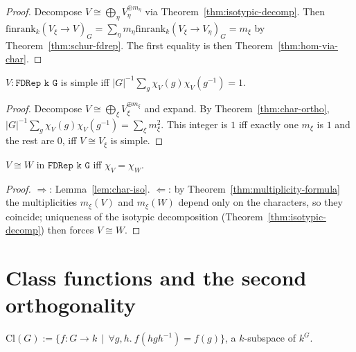 \begin{proof}
  Decompose $V \cong \bigoplus_\eta V_\eta^{\oplus m_\eta}$ via
  Theorem~\ref{thm:isotypic-decomp}. Then
  $\mathrm{finrank}_k(V_\xi \to V)_G = \sum_\eta m_\eta \mathrm{finrank}_k(V_\xi \to V_\eta)_G
  = m_\xi$ by Theorem~\ref{thm:schur-fdrep}. The first equality is then
  Theorem~\ref{thm:hom-via-char}.
\end{proof}

\begin{corollary}
  \label{cor:irred-test}
  $V : \texttt{FDRep k G}$ is simple iff
  $|G|^{-1}\sum_g \chi_V(g)\chi_V(g^{-1}) = 1$.
\end{corollary}

\begin{proof}
  Decompose $V \cong \bigoplus_\xi V_\xi^{\oplus m_\xi}$ and expand. By
  Theorem~\ref{thm:char-ortho}, $|G|^{-1}\sum_g \chi_V(g)\chi_V(g^{-1}) =
  \sum_\xi m_\xi^2$. This integer is $1$ iff exactly one $m_\xi$ is $1$ and
  the rest are $0$, iff $V \cong V_\xi$ is simple.
\end{proof}

\begin{corollary}
  \label{cor:char-separates}
  $V \cong W$ in $\texttt{FDRep k G}$ iff $\chi_V = \chi_W$.
\end{corollary}

\begin{proof}
  $\Rightarrow$: Lemma~\ref{lem:char-iso}. $\Leftarrow$: by
  Theorem~\ref{thm:multiplicity-formula} the multiplicities $m_\xi(V)$ and
  $m_\xi(W)$ depend only on the characters, so they coincide; uniqueness of
  the isotypic decomposition (Theorem~\ref{thm:isotypic-decomp}) then forces
  $V \cong W$.
\end{proof}

\section{Class functions and the second orthogonality}

\begin{definition}
  \label{def:cl-G}
  $\mathrm{Cl}(G) := \{f : G \to k \,\mid\, \forall g, h.\ f(hgh^{-1}) = f(g)\}$,
  a $k$-subspace of $k^G$.
\end{definition}

